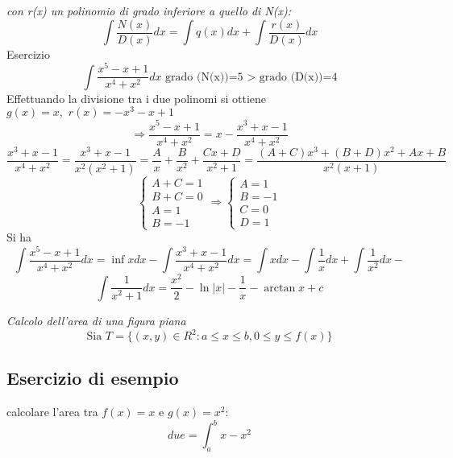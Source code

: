 \begin{description}
		\textit{con r(x) un polinomio di grado inferiore a quello di N(x):}
		\begin{equation*}
			\int \frac{N(x)}{D(x)}dx=\int q(x)dx+\int \frac{r(x)}{D(x)}dx
		\end{equation*}
		Esercizio
		\begin{equation*}
			\int \frac{x^5-x+1}{x^4+x^2}dx \text{ grado (N(x))=5 > grado
			(D(x))=4}
		\end{equation*}
		Effettuando la divisione tra i due polinomi si ottiene $g(x)=x, \text{
		} r(x)=-x^3-x+1$
		\begin{equation*}
			\Rightarrow \frac{x^5-x+1}{x^4+x^2}=x-\frac{x^3+x-1}{x^4+x^2}
		\end{equation*}
		\begin{equation*}
			\frac{x^3+x-1}{x^4+x^2}=\frac{x^3+x-1}{x^2(x^2+1)}=\frac{A}{x}+
			\frac{B}{x^2}+\frac{Cx+D}{x^2+1}=
			\frac{(A+C)x^3+(B+D)x^2+Ax+B}{x^2(x+1)}
		\end{equation*}
		\begin{equation*}
			\begin{cases}
				A+C=1\\
				B+C=0\\
				A=1\\
				B=-1
			\end{cases}\Rightarrow
			\begin{cases}
				A=1\\
				B=-1\\
				C=0\\
				D=1
			\end{cases}
		\end{equation*}
		Si ha
		\begin{equation*}
			\int \frac{x^5-x+1}{x^4+x^2}dx=\inf xdx-\int
			\frac{x^3+x-1}{x^4+x^2}dx=\int xdx-\int \frac{1}{x}dx+\int
			\frac{1}{x^2} dx-
		\end{equation*}
		\begin{equation*}
			\int\frac{1}{x^2+1}dx=\frac{x^2}{2}-\ln|x|-\frac{1}{x}-\arctan x+c
		\end{equation*}
\end{description}
\textit{\color{red}Calcolo dell'area di una figura piana}
\begin{equation*}
	\text{Sia } T=\{(x,y)\in R^2:a\leq x\leq b, 0\leq y\leq f(x)\}
\end{equation*}
\subsection{Esercizio di esempio}
calcolare l'area tra $f(x)=x$ e $g(x)=x^2$:
\begin{equation*}
	due=\int^b_a x-x^2 
\end{equation*}

